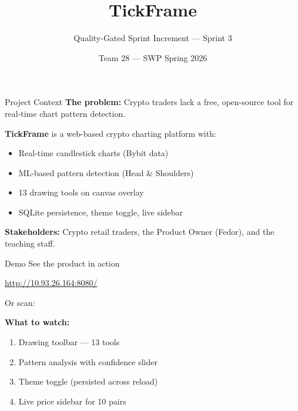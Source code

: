 \documentclass[11pt]{beamer}
\title{TickFrame}
\subtitle{Quality-Gated Sprint Increment --- Sprint 3}
\author{Team 28 --- SWP Spring 2026}
\institute{Innopolis University}
\date{}
\begin{document}
\begin{frame}
    \titlepage
\end{frame}

\begin{frame}{Project Context}
    \textbf{The problem:} Crypto traders lack a free, open-source tool for real-time chart pattern detection.

    \vspace{0.3cm}
    \textbf{TickFrame} is a web-based crypto charting platform with:
    \begin{itemize}
        \item Real-time candlestick charts (Bybit data)
        \item ML-based pattern detection (Head \& Shoulders)
        \item 13 drawing tools on canvas overlay
        \item SQLite persistence, theme toggle, live sidebar
    \end{itemize}

    \vspace{0.3cm}
    \textbf{Stakeholders:} Crypto retail traders, the Product Owner (Fedor), and the teaching staff.
\end{frame}

\begin{frame}{Demo}
    \centering
    \vfill
    {\Large See the product in action}

    \vspace{0.5cm}
    \url{http://10.93.26.164:8080/}

    \vspace{0.3cm}
    Or scan:

    \vspace{0.2cm}

    \vfill
    \textbf{What to watch:}
    \begin{enumerate}
        \item Drawing toolbar --- 13 tools
        \item Pattern analysis with confidence slider
        \item Theme toggle (persisted across reload)
        \item Live price sidebar for 10 pairs
    \end{enumerate}
\end{frame}
\end{document}
